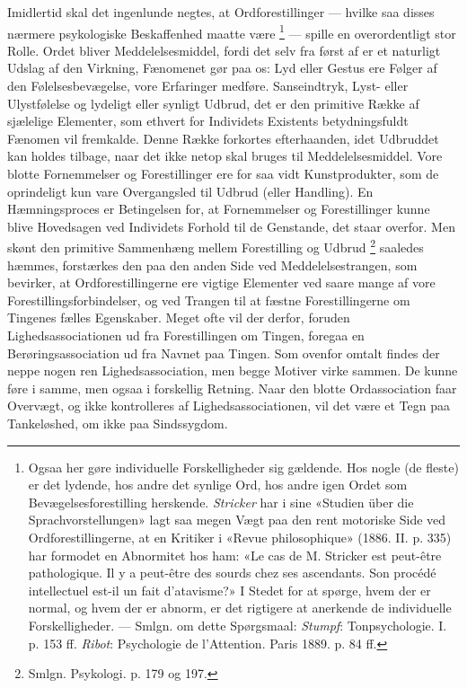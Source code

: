\documentclass[12pt,a4paper,openany]{book}
\begin{document}
Imidlertid skal det ingenlunde negtes, at Ordforestillinger --- hvilke saa
disses nærmere psykologiske Beskaffenhed maatte være%
\footnote[1]{Ogsaa her gøre individuelle Forskelligheder sig gældende. Hos
nogle (de fleste) er det lydende, hos andre det synlige Ord, hos andre igen
Ordet som Bevægelsesforestilling herskende. \emph{Stricker} har i sine «Studien
über die Sprachvorstellungen» lagt saa megen Vægt paa den rent motoriske Side
ved Ordforestillingerne, at en Kritiker i «Revue philosophique» (1886. II. p.
335) har formodet en Abnormitet hos ham: «Le cas de M. Stricker est peut-être
pathologique. Il y a peut-être des sourds chez ses ascendants. Son procédé
intellectuel est-il un fait d'atavisme?» I Stedet for at spørge, hvem der er
normal, og hvem der er abnorm, er det rigtigere at anerkende de individuelle
Forskelligheder. --- Smlgn. om dette Spørgsmaal: \emph{Stumpf}: Tonpsychologie.
I. p. 153 ff. \emph{Ribot}: Psychologie de l'Attention. Paris 1889. p. 84 ff.}
--- spille en overordentligt stor Rolle. Ordet bliver Meddelelsesmiddel, fordi
det selv fra først af er et naturligt Udslag af den Virkning, Fænomenet gør paa
os: Lyd eller Gestus ere Følger af den Følelsesbevægelse, vore Erfaringer
medføre. Sanseindtryk, Lyst- eller Ulystfølelse og lydeligt eller synligt
Udbrud, det er den primitive Række af sjælelige Elementer, som ethvert for
Individets Existents betydningsfuldt Fænomen vil fremkalde. Denne Række
forkortes efterhaanden, idet Udbruddet kan holdes tilbage, naar det ikke netop
skal bruges til Meddelelsesmiddel. Vore blotte Fornemmelser og Forestillinger
ere for saa vidt Kunstprodukter, som de oprindeligt kun vare Overgangsled til
Udbrud (eller Handling). En Hæmningsproces er Betingelsen for, at Fornemmelser
og Forestillinger kunne blive Hovedsagen ved Individets Forhold til de
Genstande, det staar overfor. Men skønt den primitive Sammenhæng mellem
Forestilling og Udbrud%
\footnote[2]{Smlgn. Psykologi. p. 179 og 197.} saaledes hæmmes, forstærkes den
paa den anden Side ved Meddelelsestrangen, som bevirker, at Ordforestillingerne
ere vigtige Elementer ved saare mange af vore Forestillingsforbindelser, og ved
Trangen til at fæstne Forestillingerne om Tingenes fælles Egenskaber. Meget
ofte vil der derfor, foruden Lighedsassociationen ud fra Forestillingen om
Tingen, foregaa en Berøringsassociation ud fra Navnet paa Tingen. Som ovenfor
omtalt findes der neppe nogen ren Lighedsassociation, men begge Motiver virke
sammen. De kunne føre i samme, men ogsaa i forskellig Retning. Naar den blotte
Ordassociation faar Overvægt, og ikke kontrolleres af Lighedsassociationen, vil
det være et Tegn paa Tankeløshed, om ikke paa Sindssygdom.
\end{document}
